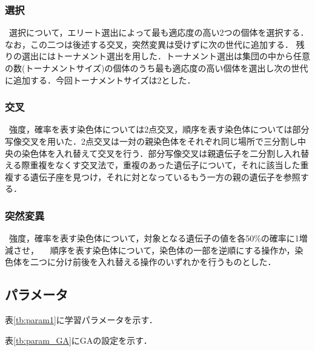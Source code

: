\documentclass[twocolumn]{jarticle}     %
\begin{document}
\subsubsection{選択}
\ 選択について，エリート選出によって最も適応度の高い2つの個体を選択する．なお，この二つは後述する交叉，突然変異は受けずに次の世代に追加する．
残りの選出にはトーナメント選出を用した．トーナメント選出は集団の中から任意の数(トーナメントサイズ)の個体のうち最も適応度の高い個体を選出し次の世代に追加する．今回トーナメントサイズは2とした．
　
\subsubsection{交叉}
\ 強度，確率を表す染色体については2点交叉，順序を表す染色体については部分写像交叉を用いた．2点交叉は一対の親染色体をそれぞれ同じ場所で三分割し中央の染色体を入れ替えて交叉を行う．部分写像交叉は親遺伝子を二分割し入れ替える際重複をなくす交叉法で，重複のあった遺伝子について，それに該当した重複する遺伝子座を見つけ，それに対となっているもう一方の親の遺伝子を参照する．
　
\subsubsection{突然変異}
\ 強度，確率を表す染色体について，対象となる遺伝子の値を各50\%の確率に1増減させ，
　順序を表す染色体について，染色体の一部を逆順にする操作か，染色体を二つに分け前後を入れ替える操作のいずれかを行うものとした．
　
\subsection{パラメータ}
表\ref{tb:param1}に学習パラメータを示す．
\begin{table}[h]
	\centering
	\caption{学習パラメータ\label{tb:param1}}
\end{table}
 表\ref{tb:param_GA}にGAの設定を示す．
\begin{table}[h]
	\centering
	\caption{実験パラメータ\label{tb:param_GA}}
\end{table}
\end{document}
